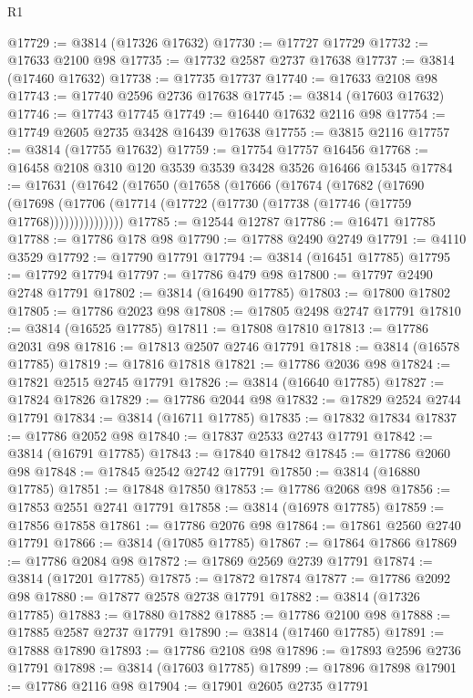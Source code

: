 \begin{lexlean}{R1}
\begin{coremodule}
@17729 := @3814 (@17326 @17632)
@17730 := @17727 @17729
@17732 := @17633 @2100 @98
@17735 := @17732 @2587 @2737 @17638
@17737 := @3814 (@17460 @17632)
@17738 := @17735 @17737
@17740 := @17633 @2108 @98
@17743 := @17740 @2596 @2736 @17638
@17745 := @3814 (@17603 @17632)
@17746 := @17743 @17745
@17749 := @16440 @17632 @2116 @98
@17754 := @17749 @2605 @2735 @3428 @16439 @17638
@17755 := @3815 @2116
@17757 := @3814 (@17755 @17632)
@17759 := @17754 @17757 @16456
@17768 := @16458 @2108 @310 @120 @3539 @3539 @3428 @3526 @16466 @15345
@17784 := @17631
    (@17642
      (@17650
        (@17658
          (@17666
            (@17674
              (@17682
                (@17690
                  (@17698
                    (@17706 (@17714 (@17722 (@17730 (@17738 (@17746 (@17759 @17768)))))))))))))))
@17785 := @12544 @12787
@17786 := @16471 @17785
@17788 := @17786 @178 @98
@17790 := @17788 @2490 @2749
@17791 := @4110 @3529
@17792 := @17790 @17791
@17794 := @3814 (@16451 @17785)
@17795 := @17792 @17794
@17797 := @17786 @479 @98
@17800 := @17797 @2490 @2748 @17791
@17802 := @3814 (@16490 @17785)
@17803 := @17800 @17802
@17805 := @17786 @2023 @98
@17808 := @17805 @2498 @2747 @17791
@17810 := @3814 (@16525 @17785)
@17811 := @17808 @17810
@17813 := @17786 @2031 @98
@17816 := @17813 @2507 @2746 @17791
@17818 := @3814 (@16578 @17785)
@17819 := @17816 @17818
@17821 := @17786 @2036 @98
@17824 := @17821 @2515 @2745 @17791
@17826 := @3814 (@16640 @17785)
@17827 := @17824 @17826
@17829 := @17786 @2044 @98
@17832 := @17829 @2524 @2744 @17791
@17834 := @3814 (@16711 @17785)
@17835 := @17832 @17834
@17837 := @17786 @2052 @98
@17840 := @17837 @2533 @2743 @17791
@17842 := @3814 (@16791 @17785)
@17843 := @17840 @17842
@17845 := @17786 @2060 @98
@17848 := @17845 @2542 @2742 @17791
@17850 := @3814 (@16880 @17785)
@17851 := @17848 @17850
@17853 := @17786 @2068 @98
@17856 := @17853 @2551 @2741 @17791
@17858 := @3814 (@16978 @17785)
@17859 := @17856 @17858
@17861 := @17786 @2076 @98
@17864 := @17861 @2560 @2740 @17791
@17866 := @3814 (@17085 @17785)
@17867 := @17864 @17866
@17869 := @17786 @2084 @98
@17872 := @17869 @2569 @2739 @17791
@17874 := @3814 (@17201 @17785)
@17875 := @17872 @17874
@17877 := @17786 @2092 @98
@17880 := @17877 @2578 @2738 @17791
@17882 := @3814 (@17326 @17785)
@17883 := @17880 @17882
@17885 := @17786 @2100 @98
@17888 := @17885 @2587 @2737 @17791
@17890 := @3814 (@17460 @17785)
@17891 := @17888 @17890
@17893 := @17786 @2108 @98
@17896 := @17893 @2596 @2736 @17791
@17898 := @3814 (@17603 @17785)
@17899 := @17896 @17898
@17901 := @17786 @2116 @98
@17904 := @17901 @2605 @2735 @17791

\end{coremodule}
\end{lexlean}
